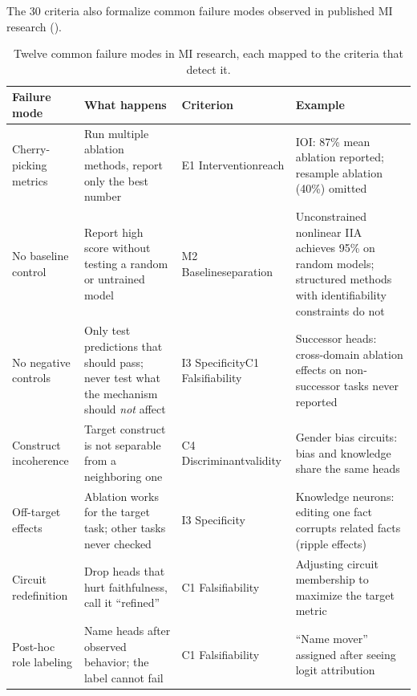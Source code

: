 \documentclass{article}
\begin{document}
The 30 criteria also formalize common failure modes observed in published MI research ().

\begingroup
\small
\begin{table}[H]
\centering
\caption{Twelve common failure modes in MI research, each mapped to the criteria that detect it.}
\label{tab:failures}
\renewcommand{\arraystretch}{1.15}
\begin{tabular}{@{}l>{\raggedright\arraybackslash}p{3.2cm}>{\raggedright\arraybackslash}p{2.8cm}>{\raggedright\arraybackslash}p{4.0cm}@{}}
\toprule
\textbf{Failure mode} & \textbf{What happens} & \textbf{Criterion} & \textbf{Example} \\
\midrule
Cherry-picking metrics & Run multiple ablation methods, report only the best number & E1 Intervention\newline reach & IOI: 87\% mean ablation reported; resample ablation (40\%) omitted \\
\midrule
No baseline control & Report high score without testing a random or untrained model & M2 Baseline\newline separation & Unconstrained nonlinear IIA achieves 95\% on random models; structured methods with identifiability constraints do not \citep{sutter2025nonlinear} \\
\midrule
No negative controls & Only test predictions that should pass; never test what the mechanism should \emph{not} affect & I3 Specificity\newline C1 Falsifiability & Successor heads: cross-domain ablation effects on non-successor tasks never reported \\
\midrule
Construct incoherence & Target construct is not separable from a neighboring one & C4 Discriminant\newline validity & Gender bias circuits: bias and knowledge share the same heads \\
\midrule
Off-target effects & Ablation works for the target task; other tasks never checked & I3 Specificity & Knowledge neurons: editing one fact corrupts related facts (ripple effects) \\
\midrule
Circuit redefinition & Drop heads that hurt faithfulness, call it ``refined'' & C1 Falsifiability & Adjusting circuit membership to maximize the target metric \\
\midrule
Post-hoc role labeling & Name heads after observed behavior; the label cannot fail & C1 Falsifiability & ``Name mover'' assigned after seeing logit attribution \\

\end{tabular}
\end{table}
\end{document}
